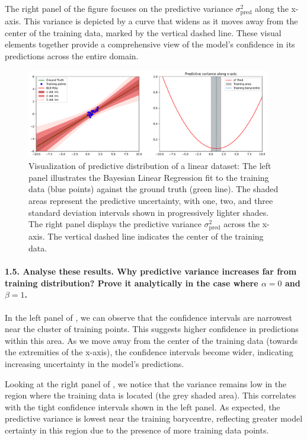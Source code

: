 The right panel of the figure focuses on the predictive variance \( \sigma^2_{\text{pred}}  \) along the x-axis. This variance is depicted by a curve that widens as it moves away from the center of the training data, marked by the vertical dashed line. These visual elements together provide a comprehensive view of the model's confidence in its predictions across the entire domain.
\begin{figure}[H]
    \centering
    \includegraphics[width=0.95\textwidth]{phi_linear.pdf}
    \caption{Visualization of predictive distribution of a linear dataset: The left panel illustrates the Bayesian Linear Regression fit to the training data (blue points) against the ground truth (green line). The shaded areas represent the predictive uncertainty, with one, two, and three standard deviation intervals shown in progressively lighter shades. The right panel displays the predictive variance $\sigma^2_{\text{pred}} $ across the x-axis. The vertical dashed line indicates the center of the training data.}
    \label{fig:phi_linear}
\end{figure}

\paragraph*{1.5. Analyse these results. Why predictive variance increases far from training distribution? Prove it analytically in the case where $\alpha=0$ and $\beta=1$.}

In the left panel of , we can observe that the confidence intervals are narrowest near the cluster of training points. This suggests higher confidence in predictions within this area. As we move away from the center of the training data (towards the extremities of the x-axis), the confidence intervals become wider, indicating increasing uncertainty in the model's predictions.

Looking at the right panel of , we notice that the variance remains low in the region where the training data is located (the grey shaded area). This correlates with the tight confidence intervals shown in the left panel. As expected, the predictive variance is lowest near the training barycentre, reflecting greater model certainty in this region due to the presence of more training data points.

